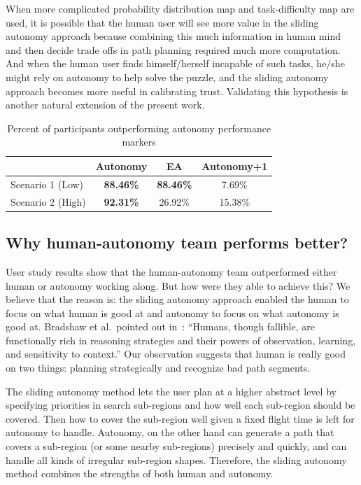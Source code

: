 \documentclass[journal]{IEEEtran}
\begin{document}
When more complicated probability distribution map and task-difficulty map are used, it is possible that the human user will see more value in the sliding autonomy approach because combining this much information in human mind and then decide trade offs in path planning required much more computation. And when the human user finds himself/herself incapable of such tasks, he/she might rely on autonomy to help solve the puzzle, and the sliding autonomy approach becomes more useful in calibrating trust. Validating this hypothesis is another natural extension of the present work.

\begin{table}
\caption{Percent of participants outperforming autonomy performance markers}
	\centering
		\begin{tabular}
			{|l|c|c|c|}
			\hline
			 & Autonomy & EA & Autonomy+1 \\
			\hline
			Scenario 1 (Low) & \textbf{88.46\%} & \textbf{88.46\%} & 7.69\% \\
			\hline
			Scenario 2 (High) & \textbf{92.31\%} & 26.92\% & 15.38\% \\
			\hline			
		\end{tabular}
\label{CompareToMarkers}
\end{table}

\subsection{Why human-autonomy team performs better?}

User study results show that the human-autonomy team outperformed either human or autonomy working along. But how were they able to achieve this? We believe that the reason is: the sliding autonomy approach enabled the human to focus on what human is good at and autonomy to focus on what autonomy is good at. Bradshaw et al.\ pointed out in~\cite{Bradshaw2013Seven}: ``Humans, though fallible, are functionally rich in reasoning strategies and their powers of observation, learning, and sensitivity to context.'' Our observation suggests that human is really good on two things: planning strategically and recognize bad path segments.

The sliding autonomy method lets the user plan at a higher abstract level by specifying priorities in search sub-regions and how well each sub-region should be covered. Then how to cover the sub-region well given a fixed flight time is left for autonomy to handle. Autonomy, on the other hand can generate a path that covers a sub-region (or some nearby sub-regions) precisely and quickly, and can handle all kinds of irregular sub-region shapes. Therefore, the sliding autonomy method combines the strengths of both human and autonomy.
\end{document}
